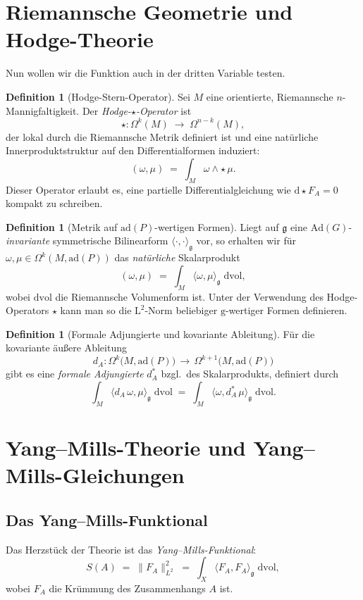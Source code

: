 \documentclass[10pt, letterpaper]{article}
\theoremstyle{custom}
\theoremstyle{definition}
\newtheorem{definition}[theorem]{Definition}
\begin{document}
\section{Riemannsche Geometrie und Hodge-Theorie}

Nun wollen wir die Funktion auch in der dritten Variable testen.

\begin{definition}[Hodge-Stern-Operator]
Sei \(M\) eine orientierte, Riemannsche \(n\)-Mannigfaltigkeit. Der \emph{Hodge-\(\star\)-Operator} ist
\[
\star: \Omega^k(M) \;\longrightarrow\; \Omega^{n-k}(M),
\]
der lokal durch die Riemannsche Metrik definiert ist und eine natürliche Innerproduktstruktur auf den Differentialformen induziert:
\[
(\omega,\mu) \;=\; \int_M \omega \wedge \star \,\mu.
\]
Dieser Operator erlaubt es, eine partielle Differentialgleichung wie \(\mathrm{d}\star F_A = 0\) kompakt zu schreiben.
\end{definition}

\begin{definition}[Metrik auf \(\mathrm{ad}(P)\)-wertigen Formen]
Liegt auf \(\mathfrak{g}\) eine \(\mathrm{Ad}(G)\)-\emph{invariante} symmetrische Bilinearform \(\langle\cdot,\cdot\rangle_{\mathfrak{g}}\) vor, so erhalten wir für \(\omega, \mu \in \Omega^k(M,\mathrm{ad}(P))\) das \emph{natürliche} Skalarprodukt
\[
(\omega,\mu)
\;=\;
\int_M \langle \omega, \mu\rangle_{\mathfrak{g}} \;\mathrm{dvol},
\]
wobei \(\mathrm{dvol}\) die Riemannsche Volumenform ist. Unter der Verwendung des Hodge-Operators \(\star\) kann man so die \(\mathrm{L}^2\)-Norm beliebiger \(\mathrm{g}\)-wertiger Formen definieren.
\end{definition}


\begin{definition}[Formale Adjungierte und kovariante Ableitung]
Für die kovariante äußere Ableitung
\[
d_A: \Omega^k\bigl(M,\mathrm{ad}(P)\bigr)\,\to\,\Omega^{k+1}\bigl(M,\mathrm{ad}(P)\bigr)
\]
gibt es eine \emph{formale Adjungierte} \(d_A^*\) bzgl.\ des Skalarprodukts, definiert durch
\[
\int_M \langle d_A \,\omega, \mu\rangle_{\mathfrak{g}}\;\mathrm{dvol}
\;=\;
\int_M \langle \omega, d_A^* \,\mu\rangle_{\mathfrak{g}}\;\mathrm{dvol}.
\]
\end{definition}


\section{Yang--Mills-Theorie und Yang--Mills-Gleichungen}

\subsection{Das Yang--Mills-Funktional}
Das Herzstück der Theorie ist das \emph{Yang--Mills-Funktional}:
\[
S(A)
\;=\;
\| F_A\|_{L^2}^2 
\;=\;
\int_X 
\langle F_A, F_A \rangle_{\mathfrak{g}}
\;\mathrm{dvol},
\]
wobei \(F_A\) die Krümmung des Zusammenhangs \(A\) ist.
\end{document}

